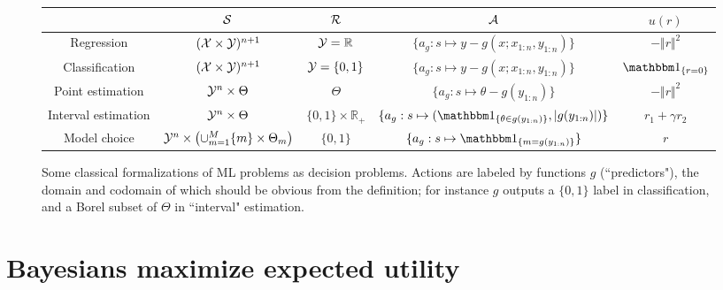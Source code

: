 \begin{figure}
    \centering
    \begin{tabular}{| c | c | c | c | c |}
        \hline
        & $\mathcal{S}$ & $\mathcal{R}$  & $\mathcal{A}$ & $u(r)$ \\
        \hline
        \hline
        Regression & $(\mathcal{X}\times \mathcal{Y})^{n+1}$& $\mathcal{Y}=\mathbb{R}$ &   
        $\{a_g:s\mapsto y-g(x;x_{1:n},y_{1:n})\}$ & $-\Vert r\Vert^2$ \\
        Classification & $(\mathcal{X}\times \mathcal{Y})^{n+1}$  &$\mathcal{Y}=\{0,1\}$ &   
        $\{a_g:s\mapsto y-g(x;x_{1:n},y_{1:n})\}$ & $\IND{r = 0}$ \\
        Point estimation & $\mathcal{Y}^n\times\Theta$ & $\Theta$& $\{a_g:s\mapsto \theta-g(y_{1:n})\}$ & $- \Vert r\Vert^2$\\
        Interval estimation & $\mathcal{Y}^n\times\Theta$ & $\{0,1\}\times \mathbb{R}_+$ & $\{a_g:s\mapsto (\IND{\theta\in g(y_{1:n})}, \vert g(y_{1:n})\vert)\}$ &  $r_1+\gamma r_2$ \\
        Model choice & $\mathcal{Y}^n\times \left (\cup_{m=1}^M \{m\}\times\Theta_m \right )$ &  $\{0,1\}$ & $\{a_g:s\mapsto \IND{m= g(y_{1:n})}\}$ & $r$ \\
        \hline
    \end{tabular}
    \label{f:decision_problems}
    \caption{Some classical formalizations of ML problems as decision problems. Actions are labeled by functions $g$ (``predictors"), the domain and codomain of which should be obvious from the definition; for instance $g$ outputs a $\{0,1\}$ label in classification, and a Borel subset of $\Theta$ in ``interval" estimation.}
\end{figure}

\section{Bayesians maximize expected utility}

